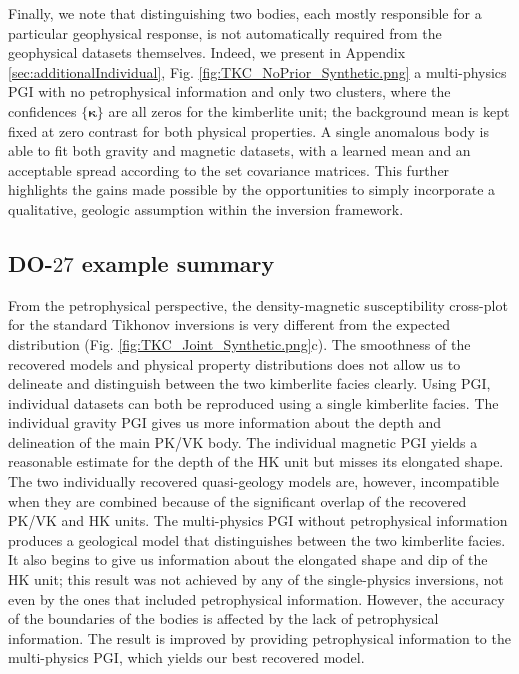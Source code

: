 \documentclass[extra, mreferee]{gji_joint} %
\begin{document}
Finally, we note that distinguishing two bodies, each mostly responsible for a particular geophysical response, is not automatically required from the geophysical datasets themselves. Indeed, we present in Appendix \ref{sec:additionalIndividual}, Fig. \ref{fig:TKC_NoPrior_Synthetic.png} a multi-physics PGI with no petrophysical information and only two clusters, where the confidences $\{\mathbf{\kappa}\}$ are all zeros for the kimberlite unit; the background mean is kept fixed at zero contrast for both physical properties. A single anomalous body is able to fit both gravity and magnetic datasets, with a learned mean and an acceptable spread according to the set covariance matrices. This further highlights the gains made possible by the opportunities to simply incorporate a qualitative, geologic assumption within the inversion framework.

\subsection{DO-$27$ example summary}

From the petrophysical perspective, the density-magnetic susceptibility cross-plot for the standard Tikhonov inversions is very different from the expected distribution (Fig. \ref{fig:TKC_Joint_Synthetic.png}c). The smoothness of the recovered models and physical property distributions does not allow us to delineate and distinguish between the two kimberlite facies clearly. Using PGI, individual datasets can both be reproduced using a single kimberlite facies. The individual gravity PGI gives us more information about the depth and delineation of the main PK/VK body. The individual magnetic PGI yields a reasonable estimate for the depth of the HK unit but misses its elongated shape. The two individually recovered quasi-geology models are, however, incompatible when they are combined because of the significant overlap of the recovered PK/VK and HK units. The multi-physics PGI without petrophysical information produces a geological model that distinguishes between the two kimberlite facies. It also begins to give us information about the elongated shape and dip of the HK unit; this result was not achieved by any of the single-physics inversions, not even by the ones that included petrophysical information. However, the accuracy of the boundaries of the bodies is affected by the lack of petrophysical information. The result is improved by providing petrophysical information to the multi-physics PGI, which yields our best recovered model.
\end{document}

